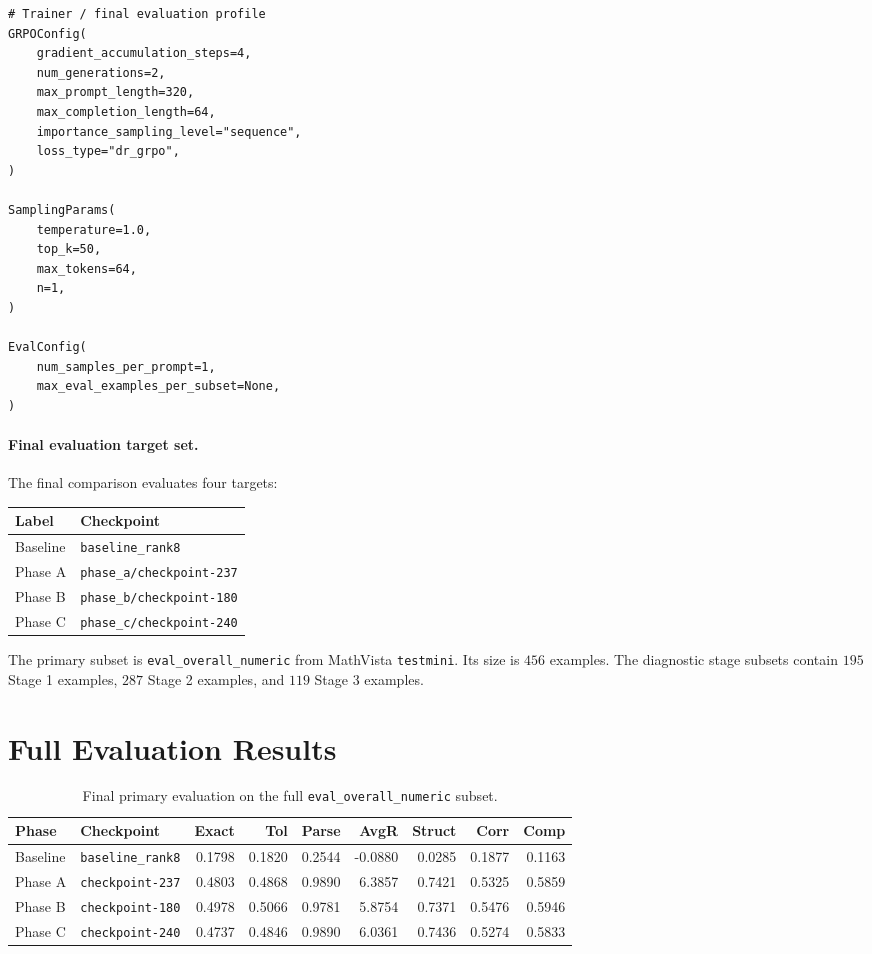 \documentclass{article} %
\begin{document}
\begin{Verbatim}[fontsize=\scriptsize,frame=single,framesep=3mm]
# Trainer / final evaluation profile
GRPOConfig(
    gradient_accumulation_steps=4,
    num_generations=2,
    max_prompt_length=320,
    max_completion_length=64,
    importance_sampling_level="sequence",
    loss_type="dr_grpo",
)

SamplingParams(
    temperature=1.0,
    top_k=50,
    max_tokens=64,
    n=1,
)

EvalConfig(
    num_samples_per_prompt=1,
    max_eval_examples_per_subset=None,
)
\end{Verbatim}

\paragraph{Final evaluation target set.}
The final comparison evaluates four targets:
\begin{center}
\small
\begin{tabular}{ll}
\toprule
Label & Checkpoint \\
\midrule
Baseline & \texttt{baseline\_rank8} \\
Phase A & \texttt{phase\_a/checkpoint-237} \\
Phase B & \texttt{phase\_b/checkpoint-180} \\
Phase C & \texttt{phase\_c/checkpoint-240} \\
\bottomrule
\end{tabular}
\end{center}
The primary subset is \texttt{eval\_overall\_numeric} from MathVista \texttt{testmini}. Its size is $456$ examples. The diagnostic stage subsets contain $195$ Stage 1 examples, $287$ Stage 2 examples, and $119$ Stage 3 examples.

\section{Full Evaluation Results}

\begin{table}[t]
\centering
\small
\caption{Final primary evaluation on the full \texttt{eval\_overall\_numeric} subset.}
\label{tab:supp-headline}
\begin{tabular}{llrrrrrrr}
\toprule
Phase & Checkpoint & Exact & Tol & Parse & AvgR & Struct & Corr & Comp \\
\midrule
Baseline & \texttt{baseline\_rank8} & 0.1798 & 0.1820 & 0.2544 & -0.0880 & 0.0285 & 0.1877 & 0.1163 \\
Phase A & \texttt{checkpoint-237} & 0.4803 & 0.4868 & 0.9890 & 6.3857 & 0.7421 & 0.5325 & 0.5859 \\
Phase B & \texttt{checkpoint-180} & 0.4978 & 0.5066 & 0.9781 & 5.8754 & 0.7371 & 0.5476 & 0.5946 \\
Phase C & \texttt{checkpoint-240} & 0.4737 & 0.4846 & 0.9890 & 6.0361 & 0.7436 & 0.5274 & 0.5833 \\
\bottomrule
\end{tabular}
\end{table}
\end{document}
